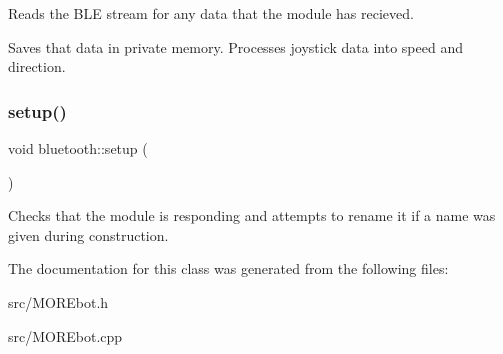 Reads the B\+LE stream for any data that the module has recieved. 

Saves that data in private memory. Processes joystick data into speed and direction. \mbox{\label{classbluetooth_a6859be315ee89d5130e198672fab774e}} 
\subsubsection{\texorpdfstring{setup()}{setup()}}
{\footnotesize\ttfamily void bluetooth\+::setup (\begin{DoxyParamCaption}{ }\end{DoxyParamCaption})}



Checks that the module is responding and attempts to rename it if a name was given during construction. 



The documentation for this class was generated from the following files\+:\begin{DoxyCompactItemize}
\item 
src/M\+O\+R\+Ebot.\+h\item 
src/M\+O\+R\+Ebot.\+cpp\end{DoxyCompactItemize}
